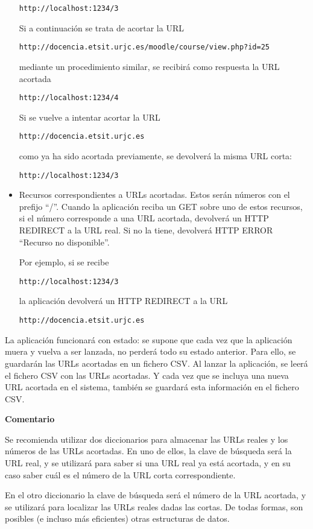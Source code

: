\begin{itemize}
\verb|http://localhost:1234/3|

Si a continuación se trata de acortar la URL

\verb|http://docencia.etsit.urjc.es/moodle/course/view.php?id=25|

mediante un procedimiento similar, se recibirá como respuesta la URL acortada

\verb|http://localhost:1234/4|

Si se vuelve a intentar acortar la URL

\verb|http://docencia.etsit.urjc.es|

como ya ha sido acortada previamente, se devolverá la misma URL corta:

\verb|http://localhost:1234/3|

\item Recursos correspondientes a URLs acortadas. Estos serán números con el prefijo ``/''. Cuando la aplicación reciba un GET sobre uno de estos recursos, si el número corresponde a una URL acortada, devolverá un HTTP REDIRECT a la URL real. Si no la tiene, devolverá HTTP ERROR ``Recurso no disponible''.

Por ejemplo, si se recibe 

\verb|http://localhost:1234/3|

la aplicación devolverá un HTTP REDIRECT a la URL

\verb|http://docencia.etsit.urjc.es|

\end{itemize}

La aplicación funcionará con estado: se supone que cada vez que la aplicación muera y vuelva a ser lanzada, no perderá todo su estado anterior. Para ello, se guardarán las URLs acortadas en un fichero CSV. Al lanzar la aplicación, se leerá el fichero CSV con las URLs acortadas. Y cada vez que se incluya una nueva URL acortada en el sistema, también se guardará esta información en el fichero CSV.

\textbf{Comentario}

Se recomienda utilizar dos diccionarios para almacenar las URLs reales y los números de las URLs acortadas. En uno de ellos, la clave de búsqueda será la URL real, y se utilizará para saber si una URL real ya está acortada, y en su caso saber cuál es el número de la URL corta correspondiente.

En el otro diccionario la clave de búsqueda será el número de la URL acortada, y se utilizará para localizar las URLs reales dadas las cortas. De todas formas, son posibles (e incluso más eficientes) otras estructuras de datos.

